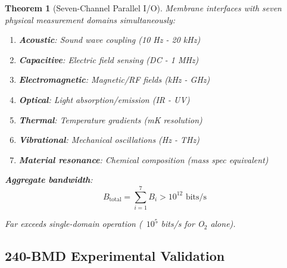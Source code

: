 \documentclass[11pt,a4paper]{article}
\newtheorem{theorem}{Theorem}[section]
\theoremstyle{definition}
\theoremstyle{remark}
\begin{document}
\begin{theorem}[Seven-Channel Parallel I/O]
Membrane interfaces with seven physical measurement domains simultaneously:

\begin{enumerate}
\item \textbf{Acoustic}: Sound wave coupling (10 Hz - 20 kHz)
\item \textbf{Capacitive}: Electric field sensing (DC - 1 MHz)
\item \textbf{Electromagnetic}: Magnetic/RF fields (kHz - GHz)
\item \textbf{Optical}: Light absorption/emission (IR - UV)
\item \textbf{Thermal}: Temperature gradients (mK resolution)
\item \textbf{Vibrational}: Mechanical oscillations (Hz - THz)
\item \textbf{Material resonance}: Chemical composition (mass spec equivalent)
\end{enumerate}

\textbf{Aggregate bandwidth}:
\begin{equation}
B_{\text{total}} = \sum_{i=1}^7 B_i > 10^{12} \text{ bits/s}
\end{equation}

Far exceeds single-domain operation (~$10^5$ bits/s for O$_2$ alone).
\end{theorem}

\subsection{240-BMD Experimental Validation}
\end{document}
